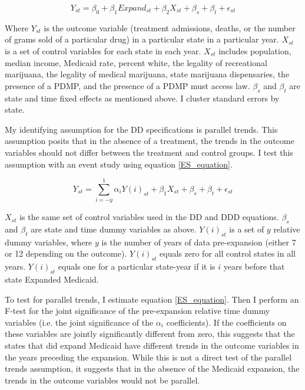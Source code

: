\documentclass[11pt]{article}
\begin{document}
\begin{equation}
    Y_{st}=\beta_0+\beta_1 Expand_{st}+\beta_2 X_{st} + \beta_s + \beta_t + \epsilon_{st}
     \label{DD}
\end{equation}


Where $Y_{st}$ is the outcome variable (treatment admissions, deaths, or the number of grams sold of a particular drug) in a particular state in a particular year.  $X_{st}$  is a set of control variables for each state in each year. $X_{st}$  includes population, median income, Medicaid rate, percent white, the legality of recreational marijuana, the legality of medical marijuana, state marijuana dispensaries, the presence of a PDMP, and the presence of a PDMP must access law.  $\beta_s$ and $\beta_t$ are state and time fixed effects as mentioned above.  I cluster standard errors by state.


My identifying assumption for the DD specifications is parallel trends. This assumption posits that in the absence of a treatment, the trends in the outcome variables should not differ between the treatment and control groups.  I test this assumption with an event study using equation \ref{ES_equation}.      

\begin{equation}
    Y_{st}=\sum_{i=-y}^1 \alpha_i Y(i)_{st}+\beta_{1} X_{st} + \beta_s + \beta_t + \epsilon_{st}
     \label{ES_equation}
\end{equation}

$X_{st}$ is the same set of control variables used in the DD and DDD equations.  $\beta_s$ and $\beta_t$ are state and time dummy variables as above. $Y(i)_{st}$ is a set of $y$ relative dummy variables, where $y$ is the number of years of data pre-expansion (either 7 or 12 depending on the outcome). $Y(i)_{st}$ equals zero for all control states in all years. $Y(i)_{st}$ equals one for a particular state-year if it is $i$ years before that state Expanded Medicaid.      

To test for parallel trends, I estimate equation \ref{ES_equation}.  Then I perform an F-test for the joint significance of the pre-expansion  relative time dummy variables (i.e. the joint significance of the  $\alpha_i$ coefficients).  If the coefficients on these variables are jointly significantly different from zero, this suggests that the states that did expand Medicaid have different trends in the outcome variables in the years preceding the expansion.  While this is not a direct test of the parallel trends assumption, it suggests that in the absence of the Medicaid expansion, the trends in the outcome variables would not be parallel. 
\end{document}
